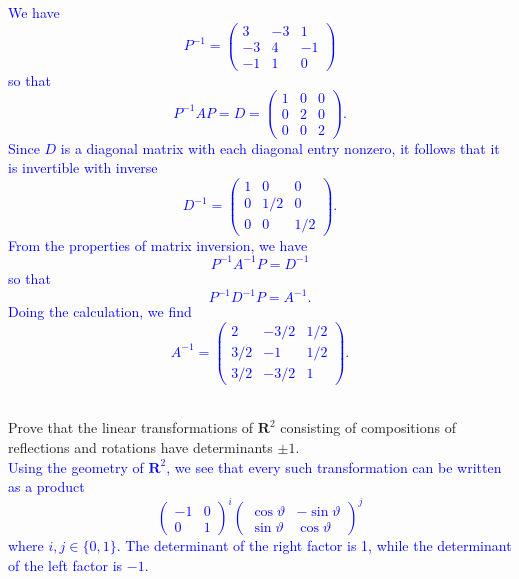 \documentclass[a4paper,11pt]{article}
\newcommand{\R}{\mathbf{R}}
\newcommand{\BB}[1]{\textcolor{blue}{#1}}
\begin{document}
\BB{We have
  \[
    P^{-1} =
    \left(
      \begin{array}{rrr}
        3 & -3 & 1 \\
        -3 & 4 & -1 \\
        -1 & 1 & 0
      \end{array}
    \right)
  \]
  so that
  \[
    P^{-1}AP = D =
    \left(
      \begin{array}{rrr}
        1 & 0 & 0 \\
        0 & 2 & 0 \\
        0 & 0 & 2
      \end{array}
    \right).
  \]
  Since $D$ is a diagonal matrix with each diagonal entry nonzero, it follows
  that it is invertible with inverse
  \[
    D^{-1} =
    \left(
      \begin{array}{rrr}
        1 & 0 & 0 \\
        0 & 1/2 & 0 \\
        0 & 0 & 1/2
      \end{array}
    \right).
  \]
  From the properties of matrix inversion, we have
  \[
    P^{-1}A^{-1}P = D^{-1}
  \]
  so that
  \[
    P^{-1}D^{-1}P = A^{-1}.
  \]
  Doing the calculation, we find
  \[
    A^{-1} =
    \left(
      \begin{array}{rrr}
        2 & -3/2 & 1/2 \\
        3/2 & -1 & 1/2 \\
        3/2 & -3/2 & 1
      \end{array}
    \right).
  \] \\
}

 Prove that the linear transformations of $\R^2$
consisting of compositions of reflections and rotations have determinants $\pm
1$. \\

\BB{Using the geometry of $\R^2$, we see that every such transformation can be
  written as a product
  \[
    \left(
      \begin{array}{rr}
        -1 & 0 \\ 0 & 1
      \end{array}
    \right)^i
    \left(
      \begin{array}{rr}
        \cos\vartheta & -\sin\vartheta \\ \sin\vartheta & \cos\vartheta
      \end{array}
    \right)^j
  \]
  where $i,j \in \{0,1\}$. The determinant of the right factor is 1, while the
  determinant of the left factor is $-1$. \\}
\end{document}
